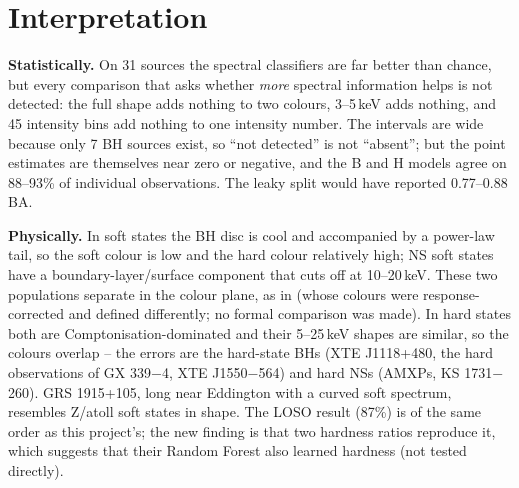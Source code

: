 \section{Interpretation}
\textbf{Statistically.} On 31 sources the spectral classifiers are far better than chance, but every comparison that asks
whether \emph{more} spectral information helps is not detected: the full shape adds nothing to two colours, 3--5\,keV
adds nothing, and 45 intensity bins add nothing to one intensity number. The intervals are wide because only 7 BH sources
exist, so ``not detected'' is not ``absent''; but the point estimates are themselves near zero or negative, and the B and
H models agree on 88--93\% of individual observations. The leaky split would have reported 0.77--0.88 BA.

\textbf{Physically.} In soft states the BH disc is cool and accompanied by a power-law tail, so the soft colour is low
and the hard colour relatively high; NS soft states have a boundary-layer/surface component that cuts off at 10--20\,keV.
These two populations separate in the colour plane, as in \citet{DoneGierlinski2003} (whose colours were response-corrected
and defined differently; no formal comparison was made). In hard states both are Comptonisation-dominated and their
5--25\,keV shapes are similar, so the colours overlap -- the errors are the hard-state BHs (XTE J1118+480, the hard
observations of GX 339$-$4, XTE J1550$-$564) and hard NSs (AMXPs, KS 1731$-$260). GRS 1915+105, long near Eddington with a
curved soft spectrum, resembles Z/atoll soft states in shape. The \citet{Pattnaik2021} LOSO result (87\%) is of the same
order as this project's; the new finding is that two hardness ratios reproduce it, which suggests that their Random Forest
also learned hardness (not tested directly).

